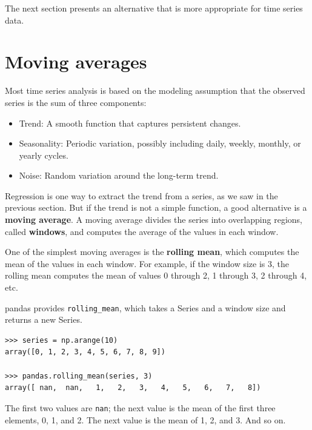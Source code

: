 \documentclass[12pt]{book}
\begin{document}
The next section presents an alternative that is more appropriate
for time series data.


\section{Moving averages}

Most time series analysis is based on the modeling assumption that the
observed series is the sum of three components:

\begin{itemize}

\item Trend: A smooth function that captures persistent changes.

\item Seasonality: Periodic variation, possibly including daily,
weekly, monthly, or yearly cycles.

\item Noise: Random variation around the long-term trend.

\end{itemize}

Regression is one way to extract the trend from a series, as we
saw in the previous section.  But if the trend is not a simple
function, a good alternative is a {\bf moving average}.  A moving
average divides the series into overlapping regions, called {\bf windows},
and computes the average of the values in each window.

One of the simplest moving averages is the {\bf rolling mean}, which
computes the mean of the values in each window.  For example, if
the window size is 3, the rolling mean computes the mean of
values 0 through 2, 1 through 3, 2 through 4, etc.

pandas provides \verb"rolling_mean", which takes a Series and a
window size and returns a new Series.

\begin{verbatim}
>>> series = np.arange(10)
array([0, 1, 2, 3, 4, 5, 6, 7, 8, 9])

>>> pandas.rolling_mean(series, 3)
array([ nan,  nan,   1,   2,   3,   4,   5,   6,   7,   8])
\end{verbatim}

The first two values are {\tt nan}; the next value is the mean of
the first three elements, 0, 1, and 2.  The next value is the mean
of 1, 2, and 3.  And so on.
\end{document}
